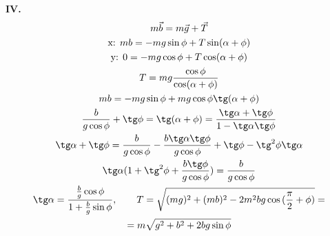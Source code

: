 \documentclass[a5paper,10pt]{article}
\begin{document}
{\begin{wrapfigure}[6]{r}{0.6\linewidth}
\begin{tikzpicture}
    \end{tikzpicture}
\end{wrapfigure}
    \textbf{IV.}
    \begin{gather*}
        m\vec{b}=m\vec{g}+\vec{T}\\
        \text{x: } mb=-mg\sin\phi+T\sin(\alpha+\phi)\\   
        \text{y: }0=-mg\cos\phi+T\cos(\alpha+\phi)\\   
        T=mg\frac{\cos\phi}{\cos(\alpha+\phi)}\\
        mb=-mg\sin\phi+mg\cos\phi\tg(\alpha+\phi)\\
        \frac{b}{g\cos\phi}+\tg\phi=\tg(\alpha+\phi)=\frac{\tg\alpha+\tg\phi}{1-\tg\alpha\tg\phi}\\
        \tg\alpha+\tg\phi=\frac{b}{g\cos\phi}-\frac{b\tg\alpha\tg\phi}{g\cos\phi}+\tg\phi-\tg^2\phi\tg\alpha\\
        \tg\alpha(1+\tg^2\phi+\frac{b\tg\phi}{g\cos\phi})=\frac{b}{g\cos\phi}\\
        \tg\alpha=\frac{\frac{b}{g}\cos\phi}{1+\frac{b}{g}\sin\phi}, \qquad
        T=\sqrt{(mg)^2+(mb)^2-2m^2bg\cos{(\frac{\pi}{2}+\phi)}}=\\=m\sqrt{g^2+b^2+2bg\sin\phi}
    \end{gather*}
}
\end{document}
